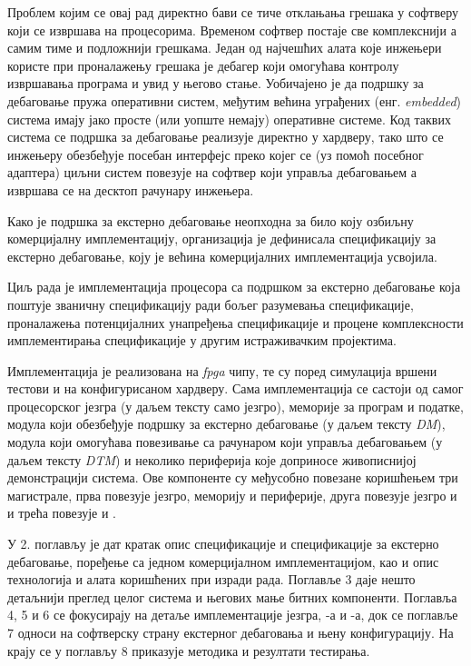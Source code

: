 Проблем којим се овај рад директно бави се тиче отклањања грешака у софтверу који се извршава на  процесорима.
Временом софтвер постаје све комплекснији а самим тиме и подложнији грешкама. 
Један од најчешћих алата које инжењери користе при проналажењу грешака је дебагер који омогућава контролу извршавања програма и увид у његово стање.
Уобичајено је да подршку за дебаговање пружа оперативни систем, међутим већина уграђених (енг. \textit{embedded}) система имају јако просте (или уопште немају) оперативне системе.
Код таквих система се подршка за дебаговање реализује директно у хардверу, тако што се инжењеру обезбеђује посебан интерфејс преко којег се (уз помоћ посебног адаптера) циљни систем повезује на софтвер који управља дебаговањем а извршава се на десктоп рачунару инжењера.

Како је подршка за екстерно дебаговање неопходна за било коју озбиљну комерцијалну имплементацију,  организација је дефинисала спецификацију за екстерно дебаговање\cite{debug_spec}, коју је већина комерцијалних имплементација усвојила.

Циљ рада је имплементација  процесора са подршком за екстерно дебаговање која поштује званичну спецификацију\cite{debug_spec} ради бољег разумевања спецификације, проналажења потенцијалних унапређења спецификације и процене комплексности имплементирања спецификације у другим истраживачким пројектима.

Имплементација је реализована на \textit{\acrfull{fpga}} чипу, те су поред симулација вршени тестови и на конфигурисаном хардверу.
Сама имплементација се састоји од самог  процесорског језгра (у даљем тексту само језгро), меморије за програм и податке, модула који обезбеђује подршку за екстерно дебаговање (у даљем тексту \textit{\acrfull{DM}}), модула који омогућава повезивање са рачунаром који управља дебаговањем (у даљем тексту \textit{\acrfull{DTM}}) и неколико периферија које доприносе живописнијој демонстрацији система. Ове компоненте су међусобно повезане коришћењем три магистрале, прва повезује језгро, меморију и периферије, друга повезује језгро и  и трећа повезује  и .

У 2. поглављу је дат кратак опис  спецификације\cite{riscv_spec} и спецификације за екстерно дебаговање\cite{debug_spec}, поређење са једном комерцијалном имплементацијом, као и опис технологија и алата коришћених при изради рада.
Поглавље 3 даје нешто детаљнији преглед целог система и његових мање битних компоненти.
Поглавља 4, 5 и 6 се фокусирају на детаље имплементације језгра, -а и -а, док се поглавље 7 односи на софтверску страну екстерног дебаговања и њену конфигурацију.
На крају се у поглављу 8 приказује методика и резултати тестирања.

